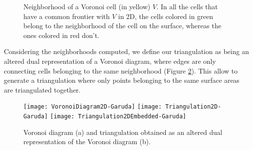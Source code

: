 \begin{figure}[ht]
\centering
{}
\caption{Neighborhood of a Voronoi cell (in yellow) $V$. In all the cells that have a common frontier with $V$ in 2D, the cells colored in green belong to the neighborhood of the cell on the surface, whereas the ones colored in red don't.}
\label{fig:voronoi_cell_neighborhood}
\end{figure}

Considering the neighborhoods computed, we define our triangulation as being an altered dual representation of a Voronoi diagram, where edges are only connecting cells belonging to the same neighborhood (Figure \ref{fig:voronoi_diagram_triangulation}).
This allow to generate a triangulation where only points belonging to the same surface areas are triangulated together.

\begin{figure}[ht]
\centering\texttt{[image: VoronoiDiagram2D-Garuda]}
\centering\texttt{[image: Triangulation2D-Garuda]}
\centering\texttt{[image: Triangulation2DEmbedded-Garuda]}
\caption{Voronoi diagram (a) and triangulation obtained as an altered dual representation of the Voronoi diagram (b).}
\label{fig:voronoi_diagram_triangulation}
\end{figure}

